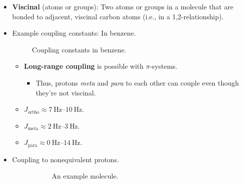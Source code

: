 \documentclass[../notes.tex]{subfiles}
\begin{document}
\begin{itemize}
    \item \textbf{Viscinal} (atoms or groups): Two atoms or groups in a molecule that are bonded to adjacent, viscinal carbon atoms (i.e., in a 1,2-relationship).
    \item Example coupling constants: In benzene.
    \begin{figure}[H]
        \centering
        \footnotesize
        \caption{Coupling constants in benzene.}
        \label{fig:couplingBenz}
    \end{figure}
    \begin{itemize}
        \item \textbf{Long-range coupling} is possible with $\pi$-systems.
        \begin{itemize}
            \item Thus, protons \emph{meta} and \emph{para} to each other can couple even though they're not viscinal.
        \end{itemize}
        \item $J_\text{ortho}\approx\SIrange{7}{10}{\hertz}$.
        \item $J_\text{meta}\approx\SIrange{2}{3}{\hertz}$.
        \item $J_\text{para}\approx\SIrange{0}{14}{\hertz}$.
    \end{itemize}
    \item Coupling to nonequivalent protons.
    \begin{figure}[h!]
        \centering
        \begin{subfigure}[b]{0.4\linewidth}
            \centering
            \footnotesize
            \caption{An example molecule.}
            \label{fig:couplingNonequiva}
        \end{subfigure}
        \begin{subfigure}[b]{0.4\linewidth}
            \centering
\end{subfigure}
\end{figure}
\end{itemize}
\end{document}
